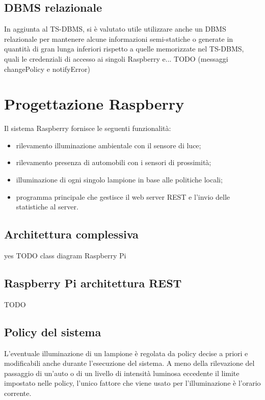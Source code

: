 \subsection{DBMS relazionale}
In aggiunta al TS-DBMS, si è valutato utile utilizzare anche un DBMS relazionale per mantenere alcune informazioni semi-statiche o generate in quantità di gran lunga inferiori rispetto a quelle memorizzate nel TS-DBMS, quali le credenziali di accesso ai singoli Raspberry e...
TODO (messaggi changePolicy e notifyError)


\section{Progettazione Raspberry}
Il sistema Raspberry fornisce le seguenti funzionalità:
\begin{itemize}
 \item rilevamento illuminazione ambientale con il sensore di luce;
 \item rilevamento presenza di automobili con i sensori di prossimità;
 \item illuminazione di ogni singolo lampione in base alle politiche locali;
 \item programma principale che gestisce il web server REST e l'invio delle statistiche al server.
\end{itemize}

\subsection{Architettura complessiva}
yes
TODO class diagram Raspberry Pi

\subsection{Raspberry Pi architettura REST}
TODO

\subsection{Policy del sistema}
L'eventuale illuminazione di un lampione è regolata da policy decise a priori e modificabili anche durante l'esecuzione del sistema.
A meno della rilevazione del passaggio di un'auto o di un livello di intensità luminosa eccedente il limite impostato nelle policy, l'unico fattore che viene usato per l'illuminazione è l'orario corrente.
